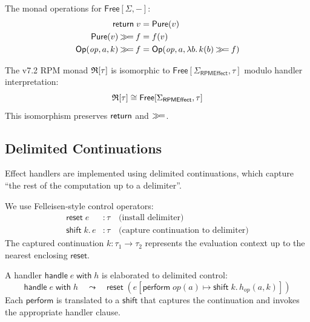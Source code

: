 \begin{definition}
\label{def:free-monad-ops}
The monad operations for $\mathsf{Free}[\Sigma, -]$:
\begin{align}
\mathsf{return}\; v &= \mathsf{Pure}(v) \\
\mathsf{Pure}(v) \mathbin{\gg\!=} f &= f(v) \\
\mathsf{Op}(\mathit{op}, a, k) \mathbin{\gg\!=} f &= \mathsf{Op}(\mathit{op}, a, \lambda b.\, k(b) \mathbin{\gg\!=} f)
\end{align}
\end{definition}

\begin{proposition}
\label{prop:rpm-free}
The v7.2 RPM monad $\mathfrak{R}[\tau]$ is isomorphic to $\mathsf{Free}[\Sigma_{\mathsf{RPMEffect}}, \tau]$ modulo handler interpretation:
\[
\mathfrak{R}[\tau] \cong \mathsf{Free}[\Sigma_{\mathsf{RPMEffect}}, \tau]
\]
This isomorphism preserves $\mathsf{return}$ and $\mathbin{\gg\!=}$.
\end{proposition}

\subsection{Delimited Continuations}
\label{subsec:delimited-cont}

Effect handlers are implemented using delimited continuations, which capture ``the rest of the computation up to a delimiter''.

\begin{definition}
\label{def:delimited-ops}
We use Felleisen-style control operators:
\begin{align}
\mathsf{reset}\; e &: \tau \quad \text{(install delimiter)} \\
\mathsf{shift}\; k.\, e &: \tau \quad \text{(capture continuation to delimiter)}
\end{align}
The captured continuation $k : \tau_1 \to \tau_2$ represents the evaluation context up to the nearest enclosing $\mathsf{reset}$.
\end{definition}

\begin{definition}
\label{def:handler-delimited}
A handler $\mathsf{handle}\; e\; \mathsf{with}\; h$ is elaborated to delimited control:
\[
\mathsf{handle}\; e\; \mathsf{with}\; h \quad \leadsto \quad \mathsf{reset}\; (e[\mathsf{perform}\; \mathit{op}(a) \mapsto \mathsf{shift}\; k.\, h_{\mathit{op}}(a, k)])
\]
Each $\mathsf{perform}$ is translated to a $\mathsf{shift}$ that captures the continuation and invokes the appropriate handler clause.
\end{definition}

